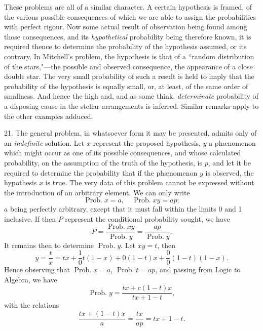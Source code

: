 \documentclass[oneside]{book}
\begin{document}
These problems are all of a similar character. A certain hypothesis
is framed, of the various possible consequences of which
we are able to assign the probabilities with perfect rigour. Now
some actual result of observation being found among those
consequences, and its \emph{hypothetical} probability being therefore known,
it is required thence to determine the probability of the hypothesis
assumed, or its contrary. In Mitchell's problem, the hypothesis
is that of a ``random distribution of the stars,"---the
possible and observed consequence, the appearance of a close
double star. The very small probability of such a result is held
to imply that the probability of the hypothesis is equally small,
or, at least, of the same order of smallness. And hence the high
and, and as some think, \emph{determinate} probability of a disposing
cause in the stellar arrangements is inferred. Similar remarks
apply to the other examples adduced.

21. The general problem, in whatsoever form it may be presented,
admits only of an \emph{indefinite} solution. Let $x$ represent the
proposed hypothesis, $y$ a ph\ae nomenon which might occur as one
of its possible consequences, and whose calculated probability, on
the assumption of the truth of the hypothesis, is $p$, and let it be
required to determine the probability that if the ph\ae nomenon $y$ is
observed, the hypothesis $x$ is true. The very data of this problem
cannot be expressed without the introduction of an arbitrary
element. We can only write
\begin{equation}\tag{1}
\operatorname{Prob. } x = a, \quad \operatorname{Prob. } xy = ap;
\end{equation}
$a$ being perfectly arbitrary, except that it must fall within the
limits 0 and 1 inclusive. If then $P$ represent the conditional
probability sought, we have
\begin{equation}\tag{2}
P=\frac{\operatorname{Prob. } xy}{\operatorname{Prob. } y} =\frac{ap}{\operatorname{Prob. } y}.
\end{equation}
It remains then to determine $\operatorname{Prob. } y$.
Let $xy = t$, then
\begin{equation}\tag{3}
y = \frac{t}{x}=tx + \frac{1}{0}t(1-x)+0(1-t)x+\frac{0}{0}(1-t)(1-x).
\end{equation}
Hence observing that $\operatorname{Prob. } x = a$, $\operatorname{Prob. } t = ap$, and passing from
Logic to Algebra, we have
\begin{equation*}
\operatorname{Prob. } y = \frac{tx + c(1-t)x}{tx+1-t},
\end{equation*}
with the relations
\begin{equation*}
\frac{tx + (1-t)x}{a}=\frac{tx}{ap}=tx+1-t.
\end{equation*}
\end{document}

